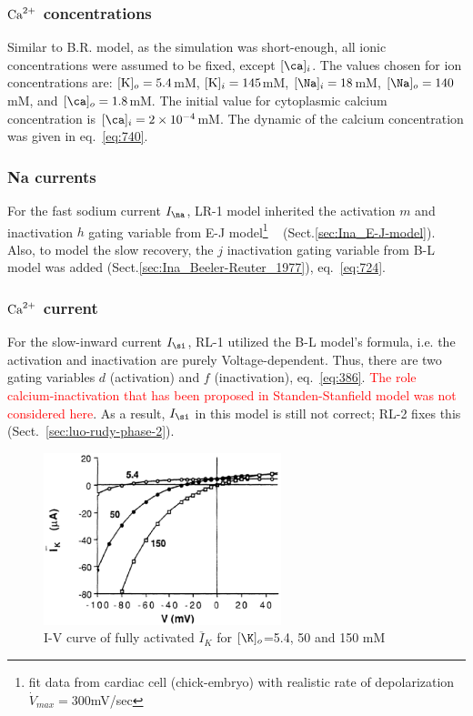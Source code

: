\subsubsection{${\text{Ca}^{2+}}$ concentrations}

Similar to B.R. model, as the simulation was short-enough, all ionic
concentrations were assumed to be fixed, except $[\ca]_i$. The
values chosen for ion concentrations are: $[\ce{K}]_o=5.4$mM,
$[\ce{K}]_i=145$mM, $[\Na]_i=18$mM, $[\Na]_o=140$mM, and
$[\ca]_o=1.8$mM. The initial value for cytoplasmic calcium
concentration is $[\ca]_i=2\times 10^{-4}$mM. The dynamic of the
calcium concentration was given in eq.~\eqref{eq:740}.

\subsubsection{Na currents}
\label{sec:ionic-currents-1}

For the fast sodium current $I_\na$, LR-1 model inherited the
activation $m$ and inactivation $h$ gating variable from E-J
model\footnote{fit data from cardiac cell (chick-embryo) with
  realistic rate of depolarization $\dot{V}_{max}=300$mV/sec}
~\citep{ebihara1980fsc} (Sect.\ref{sec:Ina_E-J-model}). Also, to model the slow
recovery, the $j$ inactivation gating variable from B-L model was added
(Sect.\ref{sec:Ina_Beeler-Reuter_1977}), eq.~\eqref{eq:724}. 

\subsubsection{${\text{Ca}^{2+}}$ current}

For the slow-inward current $I_\si$, RL-1 utilized the B-L model's
formula, i.e. the activation and inactivation are purely
Voltage-dependent. Thus, there are two gating variables $d$
(activation) and $f$ (inactivation), eq.~\eqref{eq:386}.
\textcolor{red}{The role calcium-inactivation that has been proposed
  in Standen-Stanfield model was not considered here}.
As a result, $I_\si$ in this model is still not correct; RL-2 fixes
this (Sect.~\ref{sec:luo-rudy-phase-2}).

\begin{figure}[hbt]
  \centerline{\includegraphics[height=5cm,
    angle=0]{./images/LR1_IK.eps}}
\caption{I-V curve of fully activated $\overline{I}_K$ for $[\K]_o$=5.4, 50 and
150 mM}
\label{fig:LR1_IK}
\end{figure}

